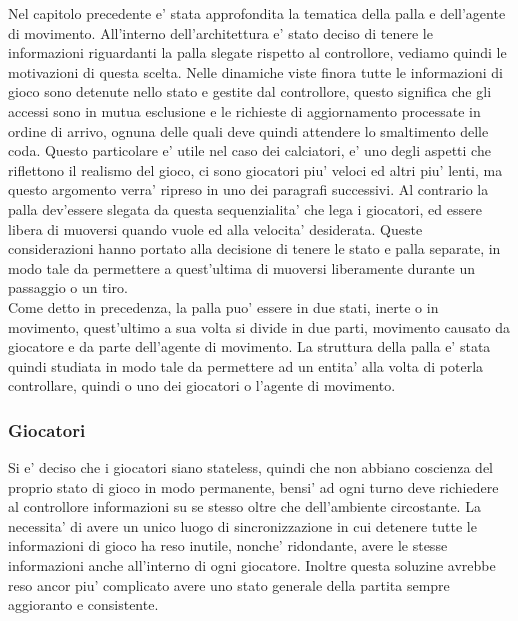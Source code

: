 Nel capitolo precedente e' stata approfondita la tematica della palla e dell'agente di movimento. All'interno dell'architettura e' stato deciso di tenere le informazioni riguardanti la palla slegate rispetto al controllore, vediamo quindi le motivazioni di questa scelta. Nelle dinamiche viste finora tutte le informazioni di gioco sono detenute nello stato e gestite dal controllore, questo significa che gli accessi sono in mutua esclusione e le richieste di aggiornamento processate in ordine di arrivo, ognuna delle quali deve quindi attendere lo smaltimento delle coda. Questo particolare e' utile nel caso dei calciatori, e' uno degli aspetti che riflettono il realismo del gioco, ci sono giocatori piu' veloci ed altri piu' lenti, ma questo argomento verra' ripreso in uno dei paragrafi successivi. Al contrario la palla dev'essere slegata da questa sequenzialita' che lega i giocatori, ed essere libera di muoversi quando vuole ed alla velocita' desiderata. Queste considerazioni hanno portato alla decisione di tenere le stato e palla separate, in modo tale da permettere a quest'ultima di muoversi liberamente durante un passaggio o un tiro.\\

Come detto in precedenza, la palla puo' essere in due stati, inerte o in movimento, quest'ultimo a sua volta si divide in due parti, movimento causato da giocatore e da parte dell'agente di movimento. La struttura della palla e' stata quindi studiata in modo tale da permettere ad un entita' alla volta di poterla controllare, quindi o uno dei giocatori o l'agente di movimento.

\subsubsection{Giocatori}
\label{sec:analisi_concorrenza_giocatori}

Si e' deciso che i giocatori siano stateless, quindi che non abbiano coscienza del proprio stato di gioco in modo permanente, bensi' ad ogni turno deve richiedere al controllore informazioni su se stesso oltre che dell'ambiente circostante. La necessita' di avere un unico luogo di sincronizzazione in cui detenere tutte le informazioni di gioco ha reso inutile, nonche' ridondante, avere le stesse informazioni anche all'interno di ogni giocatore. Inoltre questa soluzine avrebbe reso ancor piu' complicato avere uno stato generale della partita sempre aggioranto e consistente.\\

